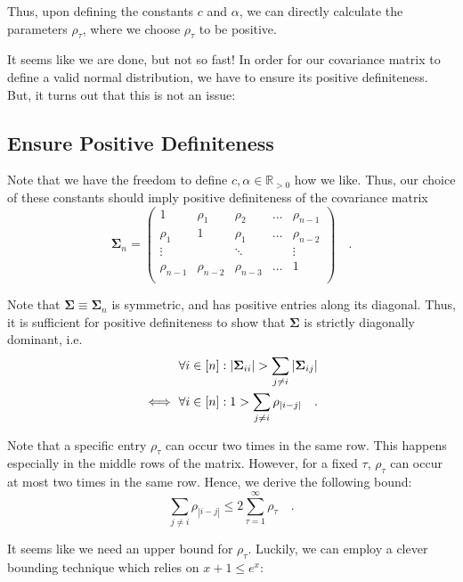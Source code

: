 \documentclass[../../main.tex]{subfiles}
\begin{document}
Thus, upon defining the constants $c$ and $\alpha$, we can directly calculate the parameters $\rho_\tau$, where we choose $\rho_\tau$ to be positive.

It seems like we are done, but not so fast! In order for our covariance matrix to define a valid normal distribution, we have to ensure its positive definiteness. But, it turns out that this is not an issue:

\subsection{Ensure Positive Definiteness}
Note that we have the freedom to define $c, \alpha \in \mathbb{R}_{>0}$ how we like. Thus, our choice of these constants should imply positive definiteness of the covariance matrix
\[
    \bm{\Sigma}_n = \begin{pmatrix*}
        1& \rho_1& \rho_2& \dots & \rho_{n-1} \\
        \rho_1& 1& \rho_1& \dots & \rho_{n-2} \\
        \vdots &  & \ddots & & \vdots \\
        \rho_{n-1} & \rho_{n-2} & \rho_{n-3} & \dots & 1 \\
    \end{pmatrix*}
    \quad .
\]

Note that $\bm{\Sigma} \equiv \bm{\Sigma}_n$ is symmetric, and has positive entries along its diagonal. Thus, it is sufficient for positive definiteness to show that $\bm{\Sigma}$ is strictly diagonally dominant, i.e.
\begin{align}
    &\forall i \in [n]: |\bm{\Sigma}_{ii}| > \sum_{j \neq i} |\bm{\Sigma}_{ij}| \notag \\
    \iff \ &\forall i \in [n]: 1 > \sum_{j \neq i} \rho_{|i-j|} \quad . \label{eq:diagonal_dominant}
\end{align}

Note that a specific entry $\rho_\tau$ can occur two times in the same row. This happens especially in the middle rows of the matrix. However, for a fixed $\tau$, $\rho_\tau$ can occur at most two times in the same row. Hence, we derive the following bound:
\begin{equation}
    \sum_{j \neq i} \rho_{|i-j|} \leq 2 \sum_{\tau = 1}^{\infty} \rho_\tau \quad . \label{eq:diagonal_dominant_sufficient}
\end{equation}

It seems like we need an upper bound for $\rho_\tau$. Luckily, we can employ a clever bounding technique which relies on $x + 1 \leq e^x$:
\end{document}
